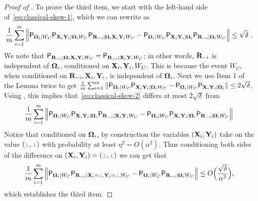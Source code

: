 \begin{proof}[Proof of ]
To prove the third item, we start with the left-hand side of~\eqref{eq:classical-skew-1}, which we can rewrite as
\begin{equation}
\label{eq:classical-skew-2}
\frac{1}{m} \sum_{i=1}^m \Big \| \mathsf{P}_{{\boldsymbol{\Omega}}_i |W_C} \mathsf{P}_{\mathbf{X}_i \mathbf{Y}_i | {\boldsymbol{\Omega}}_i W_C} \mathsf{P}_{\mathbf{R}_{-i} | {\boldsymbol{\Omega}}_i \mathbf{X}_i \mathbf{Y}_i W_C} - \mathsf{P}_{{\boldsymbol{\Omega}}_i | W_C} \mathsf{P}_{\mathbf{X}_i \mathbf{Y}_i | {\boldsymbol{\Omega}}_i} \mathsf{P}_{\mathbf{R}_{-i} |{\boldsymbol{\Omega}}_i  W_C}  \Big \| \leq \sqrt{\delta}~.
\end{equation}
We note that $\mathsf{P}_{\mathbf{R}_{-i} | {\boldsymbol{\Omega}}_i \mathbf{X}_i \mathbf{Y}_i W_C} = \mathsf{P}_{\mathbf{R}_{-i} |\mathbf{X}_i \mathbf{Y}_i W_C}$; in other words, $\mathbf{R}_{-i}$ is independent of ${\boldsymbol{\Omega}}_i$, conditioned on $\mathbf{X}_i,\mathbf{Y}_i,W_C$. This is because the event $W_C$, when conditioned on $\mathbf{R}_{-i}, \mathbf{X}_i, \mathbf{Y}_i$, is independent of ${\boldsymbol{\Omega}}_i$. Next we use Item 1 of the Lemma twice to get $\frac{1}{m} \sum_{i=1}^m \| \mathsf{P}_{{\boldsymbol{\Omega}}_i | W_C} \mathsf{P}_{\mathbf{X}_i \mathbf{Y}_i | {\boldsymbol{\Omega}}_i W_C} - \mathsf{P}_{{\boldsymbol{\Omega}}_i | W_C} \mathsf{P}_{\mathbf{X}_i \mathbf{Y}_i | {\boldsymbol{\Omega}}_i} \| \leq 2\sqrt{\delta}$. Using , this implies that~\eqref{eq:classical-skew-2} differs at most $2\sqrt{\delta}$ from
\[
\frac{1}{m} \sum_{i=1}^m \Big \| \mathsf{P}_{{\boldsymbol{\Omega}}_i |W_C} \mathsf{P}_{\mathbf{X}_i \mathbf{Y}_i | {\boldsymbol{\Omega}}_i} \mathsf{P}_{\mathbf{R}_{-i} | \mathbf{X}_i \mathbf{Y}_i W_C} - \mathsf{P}_{{\boldsymbol{\Omega}}_i | W_C} \mathsf{P}_{\mathbf{X}_i \mathbf{Y}_i | {\boldsymbol{\Omega}}_i} \mathsf{P}_{\mathbf{R}_{-i} |{\boldsymbol{\Omega}}_i  W_C}  \Big \|
\]
Notice that conditioned on ${\boldsymbol{\Omega}}_i$, by construction the variables $(\mathbf{X}_i,\mathbf{Y}_i)$ take on the value $(\dummy,\dummy)$ with probability at least $\eta^2 = O(\alpha^2)$. Thus conditioning both sides of the difference on $(\bX_i,\bY_i) = (\dummy,\dummy)$ we can get that 
\begin{equation}
\label{eq:classical-skew-3}
\frac{1}{m} \sum_{i=1}^m \Big \| \P_{\bOmega_i |W_C} \P_{\bR_\mi | \bX_i = \dummy, \bY_i = \dummy, W_C} - \P_{\bOmega_i | W_C} \P_{\bR_\mi |\bOmega_i  W_C}  \Big \| \leq O \Big( \frac{\sqrt{\delta}}{\alpha^2} \Big),
\end{equation}
which establishes the third item.


\end{proof}
